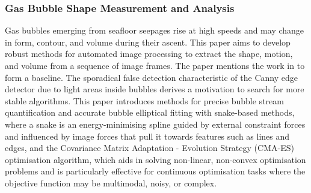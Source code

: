 \subsubsection{Gas Bubble Shape Measurement and Analysis \cite{zelenkaGasBubbleShape2014}}
Gas bubbles emerging from seafloor seepages rise at high speeds and may change in form, contour, and volume during their ascent. This paper aims to develop robust methods for automated image processing to extract the shape, motion, and volume from a sequence of image frames. The paper mentions the work in \cite{thomanekAutomatedGasBubble2010} to form a baseline. The sporadical false detection characteristic of the Canny edge detector due to light areas inside bubbles derives a motivation to search for more stable algorithms. This paper introduces methods for precise bubble stream quantification and accurate bubble elliptical fitting with snake-based methods, where a snake is an energy-minimising spline guided by external constraint forces and influenced by image forces that pull it towards features such as lines and edges, and the Covariance Matrix Adaptation - Evolution Strategy (CMA-ES) optimisation algorithm, which aids in solving non-linear, non-convex optimisation problems and is particularly effective for continuous optimisation tasks where the objective function may be multimodal, noisy, or complex.

